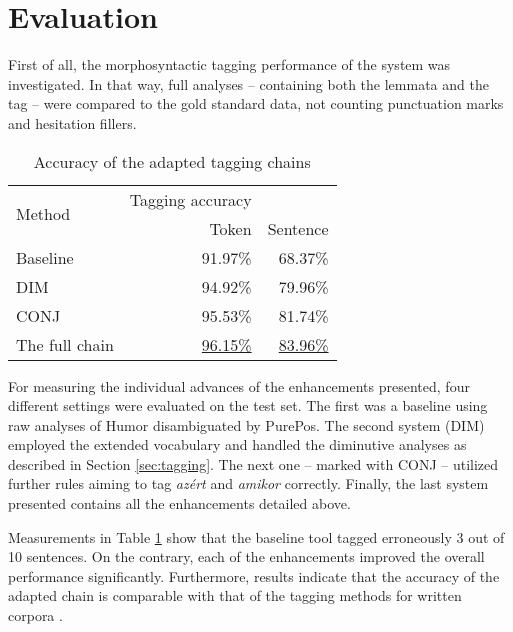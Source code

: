 \section{Evaluation}

First of all, the morphosyntactic tagging performance of the system was investigated. 
In that way, full analyses -- containing both the lemmata and the tag -- were compared to the gold standard data, not counting punctuation marks and hesitation fillers.

\begin{table}
\centering
\caption{Accuracy of the adapted tagging chains}
\label{tab:eval_tag}
\begin{tabular}{ l r r} 
\hline
\multicolumn{1}{l}{\multirow{2}{*}{Method}} & Tagging accuracy \\
& Token &  Sentence \\
\hline
Baseline & \hspace{1cm} 91.97\%  & \hspace{1cm} 68.37\% \\
DIM &  94.92\% & 79.96\% \\
CONJ & 95.53\% & 81.74\% \\
The full chain & \underline{96.15\%} & \underline{83.96\%} \\

\hline
\end{tabular}
\end{table}

For measuring the individual advances of the enhancements presented, four different settings were evaluated on the test set. 
The first was a baseline using raw analyses of Humor disambiguated by PurePos. 
The second system (DIM) employed the extended vocabulary and handled the diminutive analyses as described in Section \ref{sec:tagging}. 
The next one -- marked with CONJ -- utilized further rules aiming to tag \textit{azért} and \textit{amikor} correctly. 
Finally, the last system presented contains all the enhancements detailed above.

Measurements in Table \ref{tab:eval_tag} show that the baseline tool tagged erroneously 3 out of 10 sentences. 
On the contrary, each of the enhancements improved the overall performance significantly.
Furthermore, results indicate that the accuracy of the adapted chain is comparable with that of the tagging methods for written corpora \cite{zsibrata2013magyarlanc}. 

